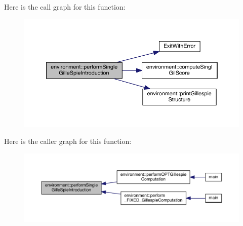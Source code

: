 Here is the call graph for this function\-:
\nopagebreak
\begin{figure}[H]
\begin{center}
\leavevmode
\includegraphics[width=350pt]{a00014_a30a0827eed2860d03d5fa5318fcf86b0_cgraph}
\end{center}
\end{figure}




Here is the caller graph for this function\-:
\nopagebreak
\begin{figure}[H]
\begin{center}
\leavevmode
\includegraphics[width=350pt]{a00014_a30a0827eed2860d03d5fa5318fcf86b0_icgraph}
\end{center}
\end{figure}


